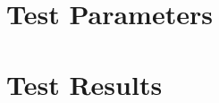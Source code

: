 \documentclass[]{BasiliskReportMemo}
\begin{document}
\section{Test Parameters}

\section{Test Results}







\end{document}
